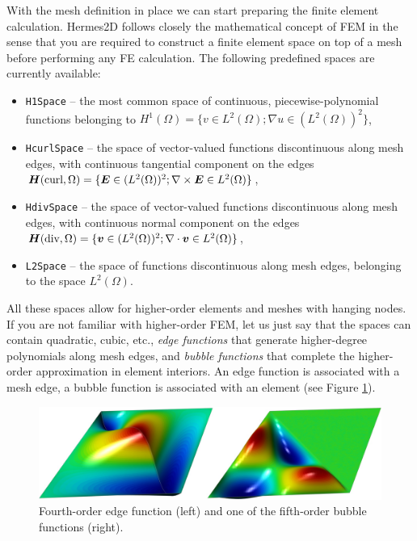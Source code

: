 \documentclass[11pt]{article}
\newcommand{\bfv}{\mbox{\boldmath $v$}}
\newcommand{\bfE}{\mbox{\boldmath $E$}}
\newcommand{\bfH}{\mbox{\boldmath $H$}}
\def\Hcurl{{\bfH({\rm curl})}}
\def\Hdiv{{\bfH({\rm div})}}
\begin{document}
With the mesh definition in place we can start preparing the finite element calculation.
Hermes2D follows closely the mathematical concept of FEM in the
sense that you are required to construct a finite element space on top of a mesh
before performing any FE calculation. The following predefined spaces are currently
available:
\begin{itemize}
  \item {\tt H1Space} --  the most common space of continuous,
        piecewise-polynomial functions belonging to $H^1(\Omega) = \{ v \in L^2(\Omega);
        \nabla u \in (L^2(\Omega))^2 \}$,
  \item {\tt HcurlSpace} -- \index{Space!$\Hcurl$} the space of vector-valued functions discontinuous along mesh edges, with
        continuous tangential component on the edges $\bfH(\mbox{curl},\Omega) = \{ \bfE \in (L^2(\Omega))^2;
        \nabla \times \bfE \in L^2(\Omega)\}$,
  \item {\tt HdivSpace} -- \index{Space!$\Hdiv$} the space of vector-valued functions discontinuous along mesh edges, with
        continuous normal component on the edges $\bfH(\mbox{div},\Omega) = \{ \bfv \in (L^2(\Omega))^2;
        \nabla \cdot \bfv \in L^2(\Omega)\}$,
  \item {\tt L2Space} --  the space of functions discontinuous along mesh edges,
        belonging to the space $L^2(\Omega)$.
\end{itemize}

  
All these spaces allow for higher-order elements and meshes with hanging nodes.
If you are not familiar with higher-order FEM, let us just say that the spaces can contain
quadratic, cubic, etc., {\em edge functions} that generate higher-degree
polynomials along mesh edges, and {\em bubble functions} that complete the higher-order
approximation in element interiors. An edge function is associated with a mesh edge,
a bubble function is associated with an element
(see Figure \ref{fig:basisfn}).

\begin{figure}[!ht]
  \centering\bigskip
  \includegraphics[width=\textwidth]{img/basisfn.jpg}
  \caption{\protect\centering Fourth-order edge function (left) and\break
  one of the fifth-order bubble functions (right).}
  \label{fig:basisfn}
\end{figure}
\end{document}
